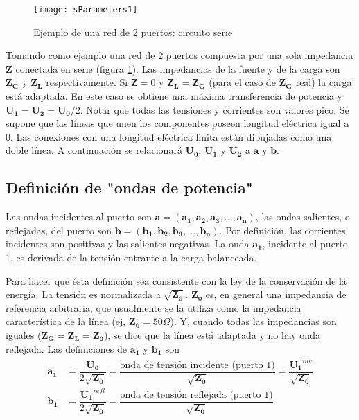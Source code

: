 \begin{figure}[H]
 \centering
 \texttt{[image: sParameters1]}
 \caption{Ejemplo de una red de 2 puertos: circuito serie \cite{Caspers}}
 \label{fig:esquema_serie}
\end{figure}

Tomando como ejemplo una red de 2 puertos compuesta por una sola impedancia $\bm{Z}$ conectada en serie (figura \ref{fig:esquema_serie}). Las impedancias de la fuente y de la carga son $\bm{Z_G}$ y $\bm{Z_L}$ respectivamente. Si $\bm{Z}=0$ y $\bm{Z_L} = \bm{Z_G}$ (para el caso de $\bm{Z_G}$ real) la carga está adaptada. En este caso se obtiene una máxima transferencia de potencia y $\bm{U_1} = \bm{U_2} = \bm{U_0}/2$. Notar que todas las tensiones y corrientes son valores pico. Se supone que las líneas que unen los componentes poseen longitud eléctrica igual a 0. Las conexiones con una longitud eléctrica finita están dibujadas como una doble línea. A continuación se relacionará $\bm{U_0}$, $\bm{U_1}$ y $\bm{U_2}$ a $\bm{a}$ y $\bm{b}$.


\subsection{Definición de "ondas de potencia"}

Las ondas incidentes al puerto son $\textbf{a}=(\bm{a_1}, \bm{a_2}, \bm{a_3}, ..., \bm{a_n})$, las ondas salientes, o reflejadas, del puerto son $\textbf{b}=(\bm{b_1}, \bm{b_2}, \bm{b_3}, ..., \bm{b_n})$. Por definición, las corrientes incidentes son positivas y las salientes negativas. La onda $\bm{a_1}$, incidente al puerto 1, es derivada de la tensión entrante a la carga balanceada.

Para hacer que ésta definición sea consistente con la ley de la conservación de la energía. La tensión es normalizada a $\sqrt{\bm{Z_0}}$. $\bm{Z_0}$ es, en general una impedancia de referencia arbitraria, que usualmente se la utiliza como la impedancia característica de la línea (ej, $\bm{Z_0} = 50 \Omega$). Y, cuando todas las impedancias son iguales ($\bm{Z_G} = \bm{Z_L} = \bm{Z_0}$), se dice que la línea está adaptada y no hay onda reflejada. Las definiciones de $\bm{a_1}$ y $\bm{b_1}$ son
\begin{equation}
\begin{aligned}
  \bm{a_1} &= \dfrac{\bm{U_0}}{2\sqrt{\bm{Z_0}}}= \dfrac{\textrm{onda de tensión incidente (puerto 1)}}{\sqrt{\bm{Z_0}}}=\dfrac{\bm{U_1}^{inc}}{\sqrt{\bm{Z_0}}} \\
  \bm{b_1} &= \dfrac{\bm{U_1}^{refl}}{2\sqrt{\bm{Z_0}}}= \dfrac{\textrm{onda de tensión reflejada (puerto 1)}}{\sqrt{\bm{Z_0}}}
\end{aligned}
\end{equation}

